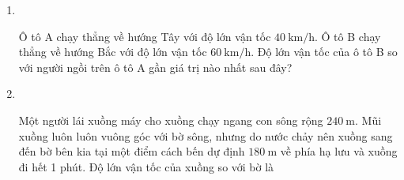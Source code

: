 \begin{enumerate}[label=\bfseries Câu \arabic*:,leftmargin=1.5cm]
\item {}\\
{Ô tô A chạy thẳng về hướng Tây với độ lớn vận tốc $\SI{40}{\kilo\meter/\hour}$. Ô tô B chạy thẳng về hướng Bắc với độ lớn vận tốc $\SI{60}{\kilo\meter/\hour}$. Độ lớn vận tốc của ô tô B so với người ngồi trên ô tô A gần giá trị nào nhất sau đây?
}

\item {}\\
{Một người lái xuồng máy cho xuồng chạy ngang con sông rộng $\SI{240}{\meter}$. Mũi xuồng luôn luôn vuông góc với bờ sông, nhưng do nước chảy nên xuồng sang đến bờ bên kia tại một điểm cách bến dự định $\SI{180}{\meter}$ về phía hạ lưu và xuồng đi hết 1 phút. Độ lớn vận tốc của xuồng so với bờ là
}
\end{enumerate}
